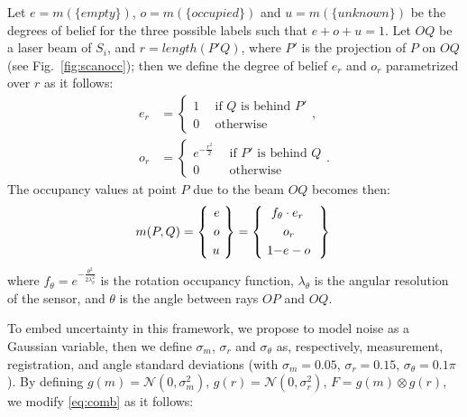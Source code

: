 Let  $e = m(\{empty\})$, $o = m(\{occupied\})$ and $u = m(\{unknown\})$ be the degrees of belief for the three possible labels such that $e + o + u = 1$. 
Let $OQ$ be a laser beam of $S_i$, and $r = length(P'Q)$, where $P'$ is the projection of $P$ on $OQ$ (see Fig.~\ref{fig:scanocc}); then we define the degree of belief $e_r$ and $o_r$ parametrized over $r$ as it follows:
\begin{align}
\label{eq:occ}
 e_r &=  \begin{cases}
               1 \ \ & \text{if $Q$ is behind $P'$}\\
               0 \ \ & \text{otherwise}
         \end{cases},\\
\label{eq:occ_2}
o_r &=  \begin{cases}
      e^{-\frac{r^2}{2}} \ \ & \text{if $P'$ is behind $Q$}\\
      0 \ \ & \text{otherwise}
        \end{cases}.
\end{align}
The occupancy values at point $P$ due to the beam $OQ$ becomes then:
\begin{equation}
\label{eq:comb}
 m(P,Q)=\left\{\  \begin{aligned}
                 e\\o\\u
                 \end{aligned}
\  \right\} = \left\{\  \begin{aligned}
                     f_\theta&\cdot e_r \ \\
                     &o_r \ \\
                     1 - &e - o \ 
                    \end{aligned}
\ \right\}\\
\end{equation}
where $f_\theta = e^{-\frac{\theta^2}{2\lambda_\theta^2}}$ is the rotation occupancy function, $\lambda_\theta$ is the angular resolution of the sensor, and $\theta$ is the angle between rays $OP$ and $OQ$.


To embed uncertainty in this framework, we propose to model noise as a Gaussian variable, then we define $\sigma_m$, $\sigma_r$ and $\sigma_\theta$ as, respectively, measurement, registration, and angle standard deviations (with $\sigma_m=0.05$, $\sigma_r=0.15$, $\sigma_{\theta}=0.1\pi$). 
By defining  $g(m) = \mathcal{N}(0, \sigma_m^2)$, $g(r) = \mathcal{N}(0, \sigma_r^2)$, $F = g(m)\otimes g(r)$, we modify \eqref{eq:comb} as it follows:

